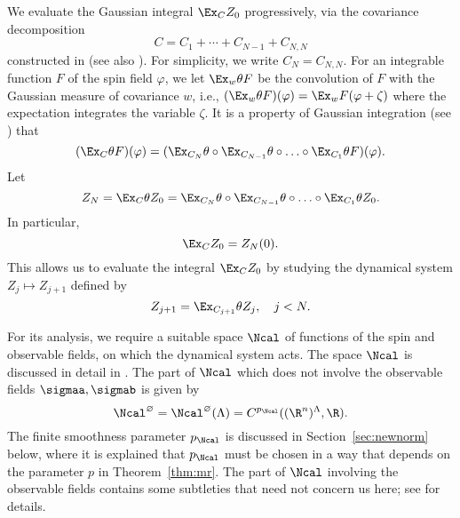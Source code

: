 We evaluate the Gaussian integral $\Ex_C Z_0$ progressively, via
the covariance decomposition
\begin{equation}
\label{e:NCj}
C = C_1 + \cdots + C_{N-1} + C_{N,N}
\end{equation}
constructed in \cite{Baue13a} (see also \cite{BGM04}). For simplicity, we write $C_N = C_{N,N}$.
For an integrable function $F$ of the spin field $\varphi$, we let
$\Ex_{w}\theta F$ be the convolution of $F$ with the Gaussian measure of covariance $w$, i.e.,
$(\Ex_w\theta F)(\varphi) = \Ex_wF(\varphi + \zeta)$ where the expectation integrates the
variable $\zeta$.
It is a property of Gaussian integration (see \cite{BS-rg-norm}) that
\begin{equation}
    (\Ex_C \theta F)(\varphi)
    =
    (\Ex_{C_N}\theta \circ \Ex_{C_{N-1}}\theta \circ \ldots \circ \Ex_{C_1}\theta F)
    (\varphi).
\end{equation}
Let
\begin{equation}
\label{e:ZNdef}
Z_N = \Ex_C \theta Z_0
=
\Ex_{C_N}\theta \circ \Ex_{C_{N-1}}\theta \circ \ldots \circ \Ex_{C_1}\theta Z_0.
\end{equation}
In particular,
\begin{equation}
\Ex_C Z_0 = Z_N(0).
\end{equation}
This allows us to evaluate the integral $\Ex_C Z_0$ by studying the
dynamical system $Z_j \mapsto Z_{j+1}$ defined by
\begin{equation}
Z_{j+1} = \Ex_{C_{j+1}} \theta Z_j, \quad j < N.
\end{equation}

For its analysis, we require
a suitable space $\Ncal$ of functions of the spin
and observable fields, on which the dynamical system acts.  The space $\Ncal$ is
discussed in detail in \cite[Section~\ref{phi4-sec:phi4observables_representation}]{ST-phi4}.
The part of $\Ncal$ which does not involve the observable fields $\sigmaa,\sigmab$ is
given by
\begin{equation}
\label{e:Ncaldef}
    \Ncal^\varnothing = \Ncal^\varnothing(\Lambda) = C^{p_\Ncal}((\R^n)^\Lambda,\R).
\end{equation}
The finite smoothness parameter $p_\Ncal$ is discussed in Section~\ref{sec:newnorm}
below,
where it is explained that $p_\Ncal$ must be chosen in a way that depends on the
parameter $p$ in Theorem~\ref{thm:mr}.
The part of $\Ncal$ involving the observable fields contains some subtleties that
need not concern us here; see \cite[Section~\ref{phi4-sec:phi4observables_representation}]{ST-phi4}
for details.

